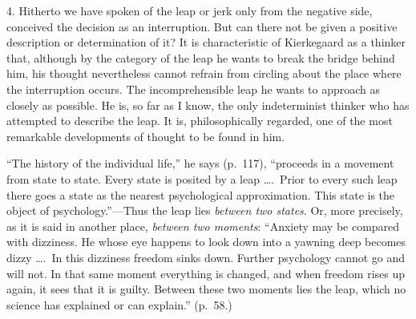 \documentclass[12pt,a4paper]{book}
\newcommand{\opage}[1]{\marginnote{\footnotesize\textit{[#1]}}}
\begin{document}
4. Hitherto we have spoken of the leap or jerk only from the negative
side, conceived the decision as an interruption. But can there not be
given a positive description or determination of it? It is
characteristic of Kierkegaard as a thinker that, although by the category
of the leap he wants to break the bridge behind him, his thought
nevertheless cannot refrain from circling about the place where the
interruption occurs. The incomprehensible leap he wants to approach as
closely as possible. He is, so far as I know, the only indeterminist
thinker who has attempted to describe the leap. It is, philosophically
regarded, one of the most remarkable developments of thought to be found
in him.

``The history of the individual life,'' he says (p.~117), ``proceeds in a
movement from state to state. Every state is posited by a leap \dots.\
Prior to every such leap there goes a state as the nearest psychological
approximation. This state is the object of psychology.''---Thus the leap
lies \textit{between two states}. Or, more precisely, as it is said in
another place, \textit{between two moments}: ``Anxiety may be compared
with dizziness. He whose eye happens to look down into a yawning deep
becomes dizzy \dots.\ In this dizziness freedom sinks down. Further
psychology cannot
\opage{79}go and will not. In that same moment everything is changed, and when
freedom rises up again, it sees that it is guilty. Between these two
moments lies the leap, which no science has explained or can explain.''
(p.~58.)
\end{document}
